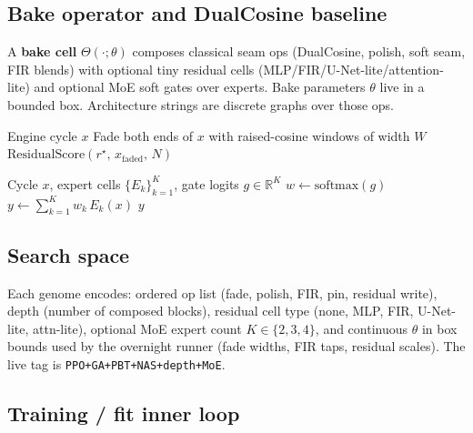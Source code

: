 \subsection{Bake operator and DualCosine baseline}
\label{sec:bake}

A \textbf{bake cell} $\Theta(\cdot;\theta)$ composes classical seam ops (DualCosine, polish, soft seam, FIR blends) with optional tiny residual cells (MLP/FIR/U-Net-lite/attention-lite) and optional MoE soft gates over experts.
Bake parameters $\theta$ live in a bounded box. Architecture strings are discrete graphs over those ops.

\begin{algorithm}[t]
\caption{DualCosine baseline}
\label{alg:dualcosine}
\begin{algorithmic}[1]
\Require Engine cycle $x$
\State Fade both ends of $x$ with raised-cosine windows of width $W$
\State \Return $\mathrm{ResidualScore}(r^{\star},\,x_{\mathrm{faded}},\,N)$
\end{algorithmic}
\end{algorithm}

\begin{algorithm}[t]
\caption{MoE soft gating over bake experts}
\label{alg:moe}
\begin{algorithmic}[1]
\Require Cycle $x$, expert cells $\{E_k\}_{k=1}^{K}$, gate logits $g\in\mathbb{R}^{K}$
\State $w \gets \mathrm{softmax}(g)$
\State $y \gets \sum_{k=1}^{K} w_k\, E_k(x)$
\State \Return $y$
\end{algorithmic}
\end{algorithm}

\subsection{Search space}
\label{sec:search-space}

Each genome encodes: ordered op list (fade, polish, FIR, pin, residual write), depth (number of composed blocks), residual cell type (none, MLP, FIR, U-Net-lite, attn-lite), optional MoE expert count $K\in\{2,3,4\}$, and continuous $\theta$ in box bounds used by the overnight runner (fade widths, FIR taps, residual scales).
The live tag is \texttt{PPO+GA+PBT+NAS+depth+MoE}.

\subsection{Training / fit inner loop}
\label{sec:fit}

